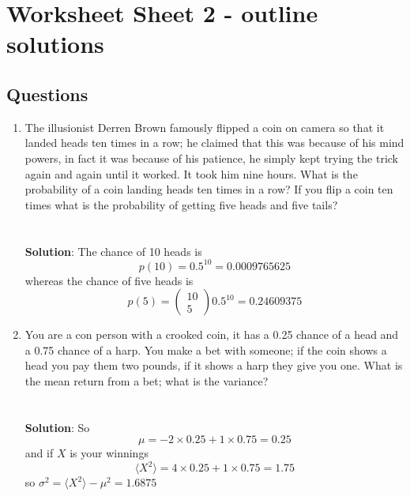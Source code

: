 \documentclass[11pt,a4paper]{scrartcl}
\begin{document}
\section*{Worksheet Sheet 2 - outline solutions}

\subsection*{Questions}

\begin{enumerate}


\item The illusionist Derren Brown famously flipped a coin on camera
  so that it landed heads ten times in a row; he claimed that this was
  because of his mind powers, in fact it was because of his patience,
  he simply kept trying the trick again and again until it
  worked. It took him nine hours. What is the probability of a coin landing heads ten times in
  a row? If you flip a coin ten times what is the probability of
  getting five heads and five tails?\\ \\ \\ \textbf{Solution}: The chance of 10 heads is
\begin{equation}
p(10)=0.5^{10}=0.0009765625
\end{equation}
whereas the chance of five heads is
\begin{equation}
p(5)=\left(\begin{array}{c}10\\5\end{array}\right)0.5^{10}=0.24609375
\end{equation}


\item You are a con person with a crooked coin, it has a 0.25 chance
  of a head and a 0.75 chance of a harp. You make a bet with someone; if
  the coin shows a head you pay them two pounds, if it shows a harp
  they give you one. What is the mean return from a bet; what is the variance?
\\ \\ \\
\textbf{Solution}: So 
\begin{equation}
\mu =-2\times 0.25 +1\times 0.75=0.25
\end{equation}
and if $X$ is your winnings
\begin{equation}
  \langle X^2\rangle=4\times 0.25 +1\times 0.75=1.75
\end{equation}
so $\sigma^2=\langle X^2\rangle-\mu^2=1.6875$
  

\end{enumerate}
\end{document}
